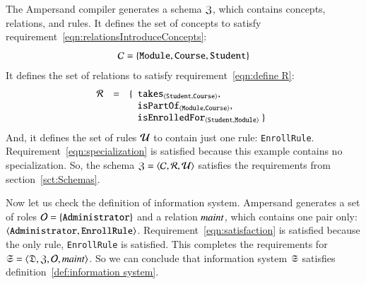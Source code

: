 \documentclass{elsarticle}
\begin{document}
   The Ampersand compiler generates a schema $\mathfrak{Z}$, which contains concepts, relations, and rules.
   It defines the set of concepts to satisfy requirement~\ref{eqn:relationsIntroduceConcepts}:
   \[\mathcal{C}=\{ {\tt Module}, {\tt Course}, {\tt Student}\}\]
   It defines the set of relations to satisfy requirement~\ref{eqn:define R}:
   \[\begin{array}{rcl}
      \rels&=&\{\begin{array}[t]{l}
                  \declare{\tt takes}{\tt Student}{\tt Course},\\
                  \declare{\tt isPartOf}{\tt Module}{\tt Course},\\
                  \declare{\tt isEnrolledFor}{\tt Student}{\tt Module}\ \}
                \end{array}
     \end{array}
   \]
   And, it defines the set of rules $\mathcal{U}$ to contain just one rule: \verb-EnrollRule-.
   Requirement~\ref{eqn:specialization} is satisfied because this example contains no specialization.
   So, the schema $\mathfrak{Z}=\langle{\mathcal{C}},{\mathcal{R}},{\mathcal{U}}\rangle$ satisfies the requirements from section~\ref{sct:Schemas}.

   Now let us check the definition of information system.
   Ampersand generates a set of roles $\mathcal{O}=\{{\tt Administrator}\}$ and
   a relation $\text{\it maint\/}$, which contains one pair only: $\langle{{\tt Administrator}},{{\tt EnrollRule}}\rangle$.
   Requirement~\ref{eqn:satisfaction} is satisfied because the only rule, {\tt EnrollRule} is satisfied.
   This completes the requirements for $\mathfrak{S}=\langle\mathfrak{D},\mathfrak{Z},\mathcal{O},\text{\it maint\/}\rangle$.
   So we can conclude that information system $\mathfrak{S}$ satisfies definition~\ref{def:information system}.
\end{document}
